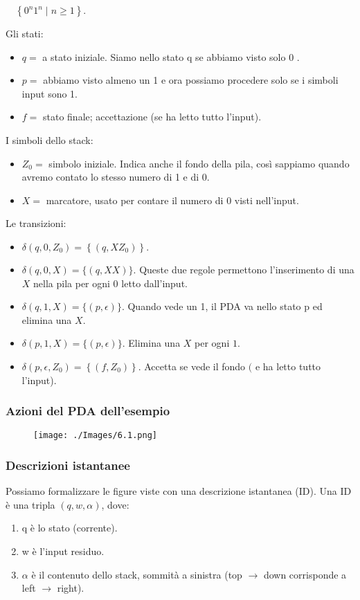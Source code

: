 $\quad\left\{0^{n} 1^{n} \mid n \geq 1\right\}$.

Gli stati:
\begin{itemize}
    \item $q=$ a stato iniziale. Siamo nello stato q se
abbiamo visto solo 0 .
    \item $p=$ abbiamo visto almeno un 1 e ora
possiamo procedere solo se i simboli input
sono 1.
    \item $f=$ stato finale; accettazione (se ha letto
tutto l'input).
\end{itemize}
I simboli dello stack:
\begin{itemize}
    \item $Z_{0}=$ simbolo iniziale. Indica anche il fondo della pila, così sappiamo quando avremo contato lo stesso numero di 1 e di $0 .$
    \item $X=$ marcatore, usato per contare il numero di 0 visti nell'input.
\end{itemize}
Le transizioni:
\begin{itemize}
    \item $ \delta\left(q, 0, Z_{0}\right)=\left\{\left(q, X Z_{0}\right)\right\} .$
    \item $ \delta(q, 0, X)=\{(q, X X)\} .$ Queste due regole
permettono l'inserimento di una $X$ nella pila per
ogni 0 letto dall'input.
    \item $ \delta(q, 1, X)=\{(p, \epsilon)\} .$ Quando vede un 1, il
PDA va nello stato p ed elimina una $X .$
    \item $ \delta(p, 1, X)=\{(p, \epsilon)\} .$ Elimina una $X$ per ogni $1 .$
    \item $ \delta\left(p, \epsilon, Z_{0}\right)=\left\{\left(f, Z_{0}\right)\right\} .$ Accetta se vede il fondo
$($ e ha letto tutto l'input).
\end{itemize}

\subsubsection{Azioni del PDA dell'esempio}

\begin{figure}[hbpt!]
    \centering
    \texttt{[image: ./Images/6.1.png]}
\end{figure}
\FloatBarrier


\subsubsection{Descrizioni istantanee}
Possiamo formalizzare le figure viste con una descrizione istantanea (ID).
Una ID è una tripla $(q, w, \alpha)$, dove:
\begin{enumerate}
    \item q è lo stato (corrente).
    \item w è l'input residuo.
    \item $\alpha$ è il contenuto dello stack, sommità a sinistra (top $\rightarrow$ down corrisponde a left $\rightarrow$ right).
\end{enumerate}

